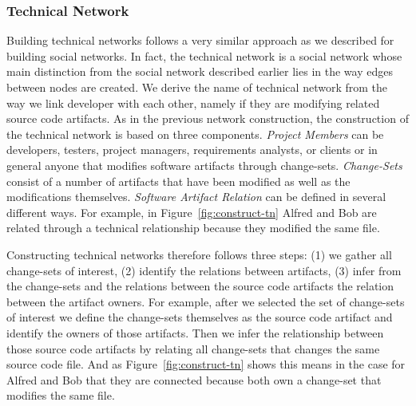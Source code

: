 
\subsubsection{Technical Network}

Building technical networks follows a very similar approach as we described for building social networks.
In fact, the technical network is a social network whose main distinction from the social network described earlier lies in the way edges between nodes are created.
We derive the name of technical network from the way we link developer with each other, namely if they are modifying related source code artifacts.
As in the previous network construction, the construction of the technical network is based on three components.
%
\emph{Project Members}  can be developers, testers, project managers, requirements analysts,
or clients or in general anyone that modifies software artifacts through change-sets. 
%
\emph{Change-Sets} consist of a number of artifacts that have been modified as well as the modifications themselves.
%
\emph{Software Artifact Relation}  can be defined in several different ways.
For example, in Figure~\ref{fig:construct-tn} Alfred and Bob are related through a technical relationship because they modified the same file.

Constructing technical networks therefore follows three steps: (1) we gather all change-sets of interest, (2) identify the relations between artifacts, (3) infer from the change-sets and the relations between the source code artifacts the relation between the artifact owners.
For example, after we selected the set of change-sets of interest we define the change-sets themselves as the source code artifact and identify the owners of those artifacts.
Then we infer the relationship between those source code artifacts by relating all change-sets that changes the same source code file.
And as Figure~\ref{fig:construct-tn} shows this means in the case for Alfred and Bob that they are connected because both own a change-set that modifies the same file.

